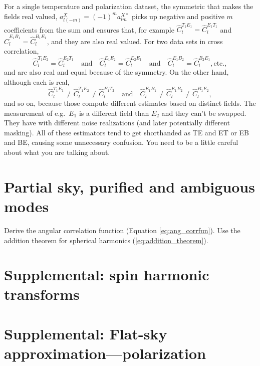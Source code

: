 For a single temperature and polarization dataset, the symmetric that makes the fields real valued, $a_{l(-m)}^X = (-1)^{m} a_{lm}^{X*}$ picks up negative and positive $m$ coefficients from the sum and ensures that, for example
$\hat C_l^{T_1E_1} = \hat C_l^{E_1T_1}$ and $\hat C_l^{E_1B_1} = \hat C_l^{B_1E_1}$, and they are also real valued.  For two data sets in cross correlation,
\begin{equation}
  \hat C_l^{T_1E_2} = \hat C_l^{E_2T_1} \quad\mbox{and}\quad
  \hat C_l^{E_1E_2} = \hat C_l^{E_2E_1} \quad\mbox{and}\quad
  \hat C_l^{E_1B_2} = \hat C_l^{B_2E_1}, \mbox{etc.},
\end{equation}
and are also real and equal because of the symmetry.  On the other hand, although each is real, 
\begin{equation}
  \hat C_l^{T_1E_1} \neq \hat C_l^{T_1E_2} \neq \hat C_l^{E_1T_2} \quad\mbox{and}\quad
  \hat C_l^{E_1B_1} \neq  \hat C_l^{E_1B_2} \neq \hat C_l^{B_1E_2},
\end{equation}
and so on, because those compute different estimates based on distinct fields.  The measurement of e.g.\ $E_1$ is a different field than $E_2$ and they can't be swapped.  They have with different noise realizations (and later potentially different masking).  All of these estimators tend to get shorthanded as TE and ET or  EB and BE, causing some unnecessary confusion.  You need to be a little careful about what you are talking about.


\section{Partial sky, purified and ambiguous modes}



\exercises

Derive the angular correlation function (Equation \ref{eq:ang_corrfun}).  Use the addition theorem for spherical harmonics (\ref{eq:addition_theorem}).  



\begin{subappendices}





\section{Supplemental: spin harmonic transforms}


\section{Supplemental: Flat-sky approximation---polarization}



\end{subappendices}
